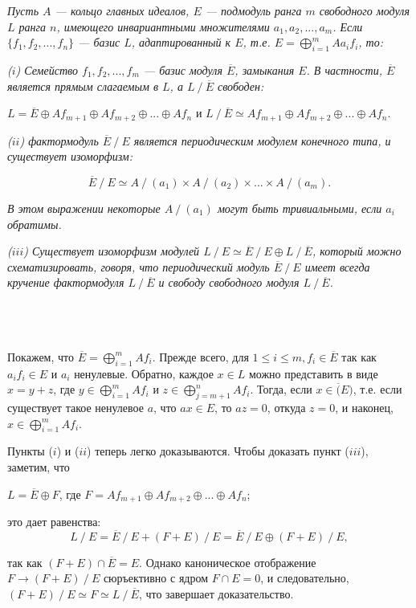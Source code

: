 \begin{predl}
\hspace*{0.5cm}

\textit{Пусть $A$ — кольцо главных идеалов, $E$ — подмодуль ранга $m$ свободного модуля $L$ ранга $n$, имеющего инвариантными множителями $a_1, a_2,...,a_m$. Если $\{f_1, f_2, ..., f_n\}$ — базис $L$, адаптированный к $E$, т.е. $E = \bigoplus ^{m} _{i=1} A a_i f_i$, то: }

\textit{ ($i$) Семейство $f_1, f_2, ...,f_m$ — базис модуля $\overline{E}$, замыкания $E$. В частности, $\overline{E}$ является прямым слагаемым в $L$, а $L~/~\overline{E}$ свободен:}
\begin{center} $ L = \overline{E} \oplus Af_{m+1} \oplus Af_{m+2} \oplus ... \oplus Af_{n}$ и $L~/~\overline{E} \simeq Af_{m+1} \oplus Af_{m+2} \oplus ... \oplus Af_{n}.$ \end{center}

\textit{ ($ii$) фактормодуль $\overline{E} ~/~ E$ является периодическим модулем конечного типа, и существует изоморфизм:}

$$ \overline{E} ~/~ E \simeq A ~/~ (a_1) \times A ~/~ (a_2) \times ... \times A ~/~ (a_m).$$

\noindent \textit{ В этом выражении некоторые $A ~/~ (a_1)$ могут быть тривиальными, если $a_i$ обратимы.}

\textit{ ($iii$) Существует изоморфизм модулей $L~/~E \simeq \overline{E} ~/~ E \oplus L ~/~ \overline{E}$, который можно схематизировать, говоря, что периодический модуль $ \overline{E} ~/~ E$ имеет всегда кручение фактормодуля $L~/~ \overline{E}$ и свободу свободного модуля $L~/~ \overline{E}$.\\\\\\\\}
\end{predl}
\begin{myproof}
Покажем, что $\overline{E} = \bigoplus ^{m} _{i=1} A f_i$. Прежде всего, для $1 \leqslant i \leqslant m, f_i \in \overline{E}$ так как $a_i f_i \in E$ и $a_i$ ненулевые. Обратно, каждое $x \in L$ можно представить в виде $x = y + z $,  где $ y \in \bigoplus ^{m} _{i=1} Af_i $ и $z \in \bigoplus ^{n} _{j=m+1}  Af_i $. Тогда, если $x \in \overline(E)$, т.е. если существует такое ненулевое $a$, что $ax \in E$, то $az=0$, откуда $z=0$, и наконец, $x \in \bigoplus ^{m} _{i=1} Af_i $.

\noindent Пункты ($i$) и ($ii$) теперь легко доказываются. Чтобы доказать пункт ($iii$), заметим, что 
\begin{center} $ L = \overline{E} \oplus F$, где $F = Af_{m+1} \oplus Af_{m+2} \oplus ... \oplus Af_n$;
\end{center}

\noindent это дает равенства:
$$ L ~/~ E = \overline{E} ~/~ E + (F + E) ~/~ E = \overline{E} ~/~ E \oplus (F + E) ~/~ E, $$

\noindent так как $ (F + E) \cap \overline{E} = E$. Однако каноническое отображение $F \rightarrow (F + E) ~/~ E$ сюръективно с ядром $F \cap E = 0$, и следовательно, $(F + E) ~/~ E  \simeq F \simeq L ~/~ \overline{E}$, что завершает доказательство.
\end{myproof}
